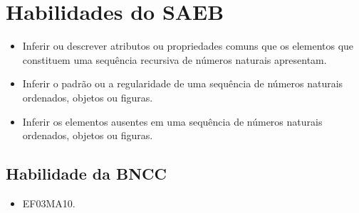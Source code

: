 \section*{Habilidades do SAEB}

\begin{itemize}
\item Inferir ou descrever atributos ou propriedades comuns que os elementos
que constituem uma sequência recursiva de números naturais apresentam.

\item Inferir o padrão ou a regularidade de uma sequência de números
naturais ordenados, objetos ou figuras.

\item Inferir os elementos ausentes em uma sequência de números naturais
ordenados, objetos ou figuras.
\end{itemize}

\subsection{Habilidade da BNCC}

\begin{itemize}
\item EF03MA10.
\end{itemize}



